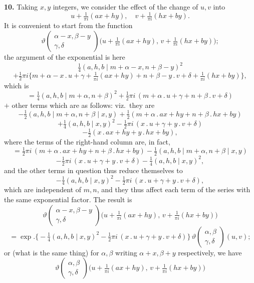 \documentclass[11pt]{article}
\begin{document}
\textbf{10.} Taking $x,y$ integers, we consider the effect of the change of $u,v$ into
\[
u + \tfrac{1}{\pi i}(ax + hy),\quad v + \tfrac{1}{\pi i}(hx + by).
\]
It is convenient to start from the function
\[
\vartheta\!\begin{pmatrix} \alpha - x,\beta - y \\ \gamma,\delta \end{pmatrix}\!\bigl(u + \tfrac{1}{\pi i}(ax + hy),\, v + \tfrac{1}{\pi i}(hx + by)\bigr);
\]
the argument of the exponential is here
\[
\tfrac{1}{4}(a,h,b\mid m + \alpha - x, n + \beta - y)^2
\]
\[
+ \tfrac{1}{2}\pi i\bigl\{m + \alpha - x\mathbin{.}u + \gamma + \tfrac{1}{\pi i}(ax + hy) + n + \beta - y\mathbin{.}v + \delta + \tfrac{1}{\pi i}(hx + by)\bigr\},
\]
which is
\[
= \tfrac{1}{4}(a,h,b\mid m + \alpha, n + \beta)^2 + \tfrac{1}{2}\pi i\,(m + \alpha\mathbin{.}u + \gamma + n + \beta\mathbin{.}v + \delta)
\]
$+$ other terms which are as follows: viz.\ they are
\[
-\tfrac{1}{2}(a,h,b\mid m + \alpha, n + \beta\mid x,y) + \tfrac{1}{2}(m + \alpha\mathbin{.}ax + hy + n + \beta\mathbin{.}hx + by)
\]
\[
+ \tfrac{1}{4}(a,h,b\mid x,y)^2 - \tfrac{1}{2}\pi i\,(x\mathbin{.}u + \gamma + y\mathbin{.}v + \delta)
\]
\[
- \tfrac{1}{2}(x\mathbin{.}ax + hy + y\mathbin{.}hx + by),
\]
where the terms of the right-hand column are, in fact,
\[
= \tfrac{1}{2}\pi i\,(m + \alpha\mathbin{.}ax + hy + n + \beta\mathbin{.}hx + by) - \tfrac{1}{2}(a,h,b\mid m + \alpha, n + \beta\mid x,y)
\]
\[
-\tfrac{1}{2}\pi i\,(x\mathbin{.}u + \gamma + y\mathbin{.}v + \delta) - \tfrac{1}{4}(a,h,b\mid x,y)^2,
\]
and the other terms in question thus reduce themselves to
\[
-\tfrac{1}{4}(a,h,b\mid x,y)^2 - \tfrac{1}{2}\pi i\,(x\mathbin{.}u + \gamma + y\mathbin{.}v + \delta),
\]
which are independent of $m,n$, and they thus affect each term of the series with the same exponential factor. The result is
\[
\vartheta\!\begin{pmatrix} \alpha - x,\beta - y \\ \gamma,\delta \end{pmatrix}\!\bigl(u + \tfrac{1}{\pi i}(ax + hy),\, v + \tfrac{1}{\pi i}(hx + by)\bigr)
\]
\[
= \exp.\bigl\{-\tfrac{1}{4}(a,h,b\mid x,y)^2 - \tfrac{1}{2}\pi i\,(x\mathbin{.}u + \gamma + y\mathbin{.}v + \delta)\bigr\}\,\vartheta\!\begin{pmatrix} \alpha,\beta \\ \gamma,\delta \end{pmatrix}\!(u,v);
\]
or (what is the same thing) for $\alpha,\beta$ writing $\alpha + x, \beta + y$ respectively, we have
\[
\vartheta\!\begin{pmatrix} \alpha,\beta \\ \gamma,\delta \end{pmatrix}\!\bigl(u + \tfrac{1}{\pi i}(ax + hy),\, v + \tfrac{1}{\pi i}(hx + by)\bigr)
\]
\end{document}
